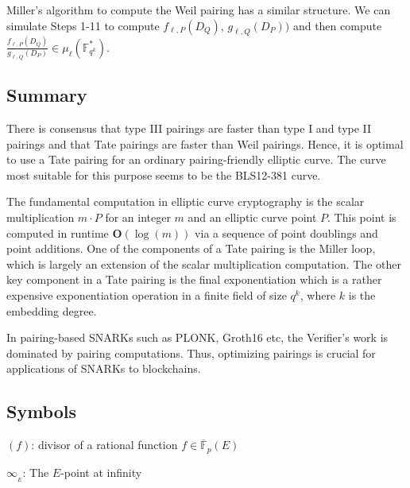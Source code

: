 \documentclass[a4paper, 11pt]{scrreprt}
\numberwithin{equation}{section}
\newcommand{\bFP}{\ov{\mathbb{F}}_p}
\newcommand{\bFqk}{\mathbb{F}_{q^k}}
\newcommand{\mbf}{\mathbf}
\newcommand{\ov}{\overline}
\newcommand{\bO}{\mbf{O}}
\newcommand{\noin}{\noindent}
\newcommand{\mule}{\mu_{\ell}}
\theoremstyle{plain}
\begin{document}
\bigskip

Miller's algorithm to compute the Weil pairing has a similar structure. We can simulate Steps 1-11 to compute $f_{\ell,P}(D_Q)$, $g_{\ell,Q}(D_P))$ and then compute $\frac{f_{\ell,P}(D_Q)}{g_{\ell,Q}(D_P)} \in \mule(\bFqk^*).$






\subsection{\fontsize{11}{11}\selectfont Summary}

There is consensus that type III pairings are faster than type I and type II pairings and that Tate pairings are faster than Weil pairings. Hence, it is optimal to use a Tate pairing for an ordinary pairing-friendly elliptic curve. The curve most suitable for this purpose seems to be the BLS12-381 curve.

The fundamental computation in elliptic curve cryptography is the scalar multiplication $m\cdot P$ for an integer $m$ and an elliptic curve point $P$. This point is computed in runtime $\bO(\log(m))$ via a sequence of point doublings and point additions. One of the components of a Tate pairing is the Miller loop, which is largely an extension of the scalar multiplication computation. The other key component in a Tate pairing is the final exponentiation which is a rather expensive exponentiation operation in a finite field of size $q^k$, where $k$ is the embedding degree.  

In pairing-based SNARKs such as PLONK, Groth16 etc, the Verifier's work is dominated by pairing computations. Thus, optimizing pairings is crucial for applications of SNARKs to blockchains.











\subsection{\fontsize{11}{11}\selectfont Symbols}

\noin $(f)$: divisor of a rational function $f\in \bFP(E)$ \vspace{2mm}

\noin $\infty_{_E}$: The $E$-point at infinity \vspace{2mm}
\end{document}
